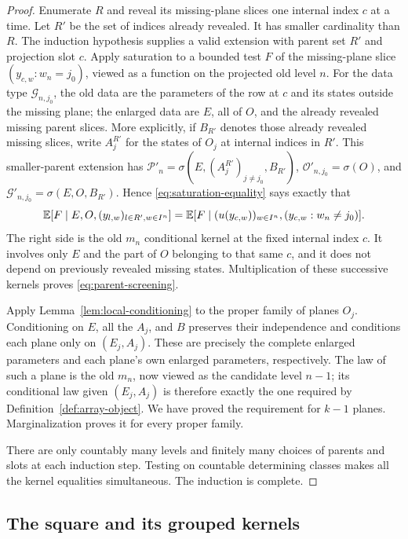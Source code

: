 \begin{proof}
Enumerate $R$ and reveal its missing-plane slices one internal index
$c$ at a time.  Let $R'$ be the set of indices already revealed.
It has smaller cardinality than $R$.  The induction hypothesis supplies
a valid extension with parent set $R'$ and projection slot $c$.
Apply saturation to a bounded test $F$ of the missing-plane slice
$(y_{c,w}:w_n=j_0)$, viewed as a function on the projected old level $n$.
For the data type $\mathcal G_{n,j_0}$, the old data are the parameters
of the row at $c$ and its states outside the missing plane; the enlarged
data are $E$, all of $O$, and the already revealed missing parent
slices. More explicitly, if $B_{R'}$ denotes those already revealed
missing slices, write $A_j^{R'}$ for the states of $O_j$ at internal
indices in $R'$.  This smaller-parent extension has
$\mathcal P'_n=\sigma(E,(A_j^{R'})_{j\ne j_0},B_{R'})$,
$\mathcal O'_{n,j_0}=\sigma(O)$, and
$\mathcal G'_{n,j_0}=\sigma(E,O,B_{R'})$. Hence
\eqref{eq:saturation-equality} says exactly that
\begin{equation}\label{eq:parent-reveal}
 \mathbb E[F\mid E,O,(y_{l,w})_{l\in R',w\in I^n}]
 =\mathbb E[F\mid (u(y_{c,w}))_{w\in I^n},
                (y_{c,w}:w_n\ne j_0)].
\end{equation}
The right side is the old $m_n$ conditional kernel at the fixed
internal index $c$.  It involves only $E$ and the part of $O$ belonging
to that same $c$, and it does not depend on previously revealed missing
states.  Multiplication of these successive kernels proves
\eqref{eq:parent-screening}.

Apply Lemma~\ref{lem:local-conditioning} to the proper family of planes
$O_j$.  Conditioning on $E$, all the $A_j$, and $B$ preserves their
independence and conditions each plane only on $(E_j,A_j)$.  These are
precisely the complete enlarged parameters and each plane's own
enlarged parameters, respectively.  The law of such a plane is the
old $m_n$, now viewed as the candidate level $n-1$; its conditional law
given $(E_j,A_j)$ is therefore exactly the one required by
Definition~\ref{def:array-object}.  We have proved the requirement for
$k-1$ planes.  Marginalization proves it for every proper family.

There are only countably many levels and finitely many choices of
parents and slots at each induction step.  Testing on countable
determining classes makes all the kernel equalities simultaneous.
The induction is complete.
\end{proof}

\subsection{The square and its grouped kernels}

